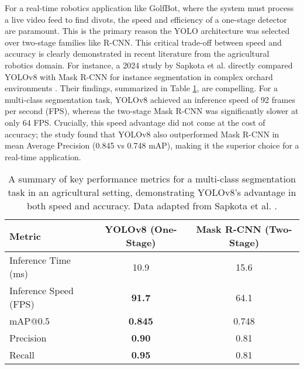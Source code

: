 For a real-time robotics application like GolfBot, where the system must process a live video feed to find divots, the speed and efficiency of a one-stage detector are paramount. This is the primary reason the YOLO architecture was selected over two-stage families like R-CNN. This critical trade-off between speed and accuracy is clearly demonstrated in recent literature from the agricultural robotics domain. For instance, a 2024 study by Sapkota et al. directly compared YOLOv8 with Mask R-CNN for instance segmentation in complex orchard environments \cite{sapkota2024comparing}. Their findings, summarized in Table \ref{tab:yolo_vs_maskrcnn}, are compelling. For a multi-class segmentation task, YOLOv8 achieved an inference speed of 92 frames per second (FPS), whereas the two-stage Mask R-CNN was significantly slower at only 64 FPS. Crucially, this speed advantage did not come at the cost of accuracy; the study found that YOLOv8 also outperformed Mask R-CNN in mean Average Precision (0.845 vs 0.748 mAP), making it the superior choice for a real-time application.

\begin{table}[h!]
    \centering
    \caption[Performance Comparison of YOLOv8 and Mask R-CNN.]
    {A summary of key performance metrics for a multi-class segmentation task in an agricultural setting, demonstrating YOLOv8's advantage in both speed and accuracy. Data adapted from Sapkota et al. \cite{sapkota2024comparing}.}
    \label{tab:yolo_vs_maskrcnn}
    \begin{tabular}{l c c}
        \hline
        \textbf{Metric} & \textbf{YOLOv8 (One-Stage)} & \textbf{Mask R-CNN (Two-Stage)} \\
        \hline
        Inference Time (ms)     & 10.9                        & 15.6                            \\
        Inference Speed (FPS)   & \textbf{91.7}               & 64.1                            \\
        mAP@0.5                 & \textbf{0.845}              & 0.748                           \\
        Precision               & \textbf{0.90}               & 0.81                            \\
        Recall                  & \textbf{0.95}               & 0.81                            \\
        \hline
    \end{tabular}
\end{table}

